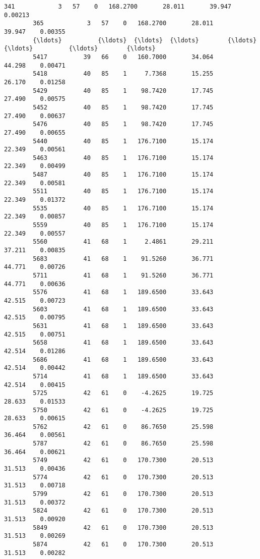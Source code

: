 \documentclass[11pt]{article}
\begin{document}
\begin{Verbatim}[commandchars=\\\{\}]
        341            3   57    0   168.2700       28.011       39.947    0.00213   
        365            3   57    0   168.2700       28.011       39.947    0.00355   
        {\ldots}          {\ldots}  {\ldots}  {\ldots}        {\ldots}          {\ldots}          {\ldots}        {\ldots}   
        5417          39   66    0   160.7000       34.064       44.298    0.00471   
        5418          40   85    1     7.7368       15.255       26.170    0.01258   
        5429          40   85    1    98.7420       17.745       27.490    0.00575   
        5452          40   85    1    98.7420       17.745       27.490    0.00637   
        5476          40   85    1    98.7420       17.745       27.490    0.00655   
        5440          40   85    1   176.7100       15.174       22.349    0.00561   
        5463          40   85    1   176.7100       15.174       22.349    0.00499   
        5487          40   85    1   176.7100       15.174       22.349    0.00581   
        5511          40   85    1   176.7100       15.174       22.349    0.01372   
        5535          40   85    1   176.7100       15.174       22.349    0.00857   
        5559          40   85    1   176.7100       15.174       22.349    0.00557   
        5560          41   68    1     2.4861       29.211       37.211    0.00835   
        5683          41   68    1    91.5260       36.771       44.771    0.00726   
        5711          41   68    1    91.5260       36.771       44.771    0.00636   
        5576          41   68    1   189.6500       33.643       42.515    0.00723   
        5603          41   68    1   189.6500       33.643       42.515    0.00795   
        5631          41   68    1   189.6500       33.643       42.515    0.00751   
        5658          41   68    1   189.6500       33.643       42.514    0.01286   
        5686          41   68    1   189.6500       33.643       42.514    0.00442   
        5714          41   68    1   189.6500       33.643       42.514    0.00415   
        5725          42   61    0    -4.2625       19.725       28.633    0.01533   
        5750          42   61    0    -4.2625       19.725       28.633    0.00615   
        5762          42   61    0    86.7650       25.598       36.464    0.00561   
        5787          42   61    0    86.7650       25.598       36.464    0.00621   
        5749          42   61    0   170.7300       20.513       31.513    0.00436   
        5774          42   61    0   170.7300       20.513       31.513    0.00718   
        5799          42   61    0   170.7300       20.513       31.513    0.00372   
        5824          42   61    0   170.7300       20.513       31.513    0.00920   
        5849          42   61    0   170.7300       20.513       31.513    0.00269   
        5874          42   61    0   170.7300       20.513       31.513    0.00282   
        

\end{Verbatim}
\end{document}
